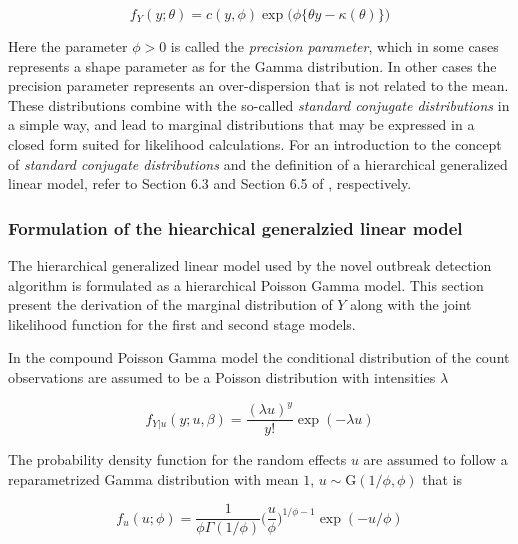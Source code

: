 \documentclass[preprint, 3p, authoryear]{elsarticle} %
\begin{document}
\begin{equation}\label{eq:expDispFam}
  f_Y(y;\theta)=c(y,\phi)\exp\big(\phi \{\theta y-\kappa(\theta) \}\big)
\end{equation}

Here the parameter \(\phi>0\) is called the \emph{precision parameter}, which in some cases represents a shape parameter as for the Gamma distribution. In other cases the precision parameter represents an over-dispersion that is not related to the mean. These distributions combine with the so-called \emph{standard conjugate distributions} in a simple way, and lead to marginal distributions that may be expressed in a closed form suited for likelihood calculations. For an introduction to the concept of \emph{standard conjugate distributions} and the definition of a hierarchical generalized linear model, refer to Section 6.3 and Section 6.5 of \citet{Madsen_2010}, respectively.

\hypertarget{formulation-of-the-hiearchical-generalzied-linear-model}{%
\subsubsection{Formulation of the hiearchical generalzied linear model}\label{formulation-of-the-hiearchical-generalzied-linear-model}}

The hierarchical generalized linear model used by the novel outbreak detection algorithm is formulated as a hierarchical Poisson Gamma model. This section present the derivation of the marginal distribution of \(Y\) along with the joint likelihood function for the first and second stage models.

In the compound Poisson Gamma model the conditional distribution of the count observations are assumed to be a Poisson distribution with intensities \(\lambda\)

\begin{equation}\label{eq:pdfPois}
  f_{Y|u}(y;u,\beta)=\frac{(\lambda u)^{y}}{y!}\exp(-\lambda u)
\end{equation}

The probability density function for the random effects \(u\) are assumed to follow a reparametrized Gamma distribution with mean \(1\), \(u \sim \mathrm{G}(1/\phi,\phi)\) that is

\begin{equation} \label{eq:pdfGamma}
  f_{u}(u;\phi)=\frac{1}{\phi \Gamma(1/\phi)} \bigg(\frac{u}{\phi}\bigg)^{1/\phi-1} \exp (-u/\phi)
\end{equation}
\end{document}
